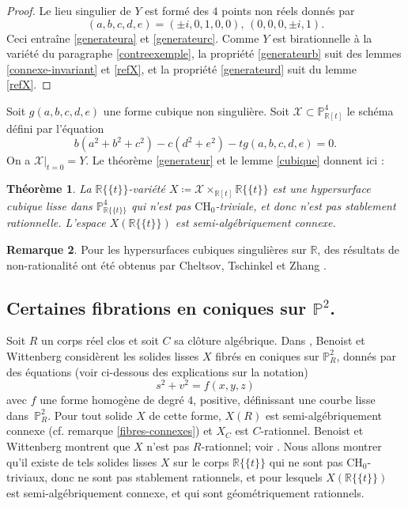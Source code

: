 \documentclass[11pt]{article}
\newcommand{\cf}{cf.\xspace}
\newcommand{\CH}{\mathrm{CH}}
\newtheorem{thm}{Théorème}[section]
\theoremstyle{definition}
\newtheorem{rmk}[thm]{Remarque}
\newcommand{\R}{\mathbb R}
\renewcommand{\P}{\mathbb P}
\newcommand{\mc}[1]{\mathcal{#1}}
\newcommand{\puiseux}{\mathbb{R}\{\!\{t\}\!\}}
\begin{document}
\begin{proof}
Le lieu singulier de $Y$ est formé des $4$ points non réels donnés par
\[
(a,b,c,d,e) = (\pm i, 0,1,0,0),\, (0,0,0, \pm i, 1).
\]
Ceci entraîne \eqref{generateura} et \eqref{generateurc}. Comme $Y$ est birationnelle à la variété du paragraphe \ref{contreexemple}, la propriété \eqref{generateurb} suit des lemmes \ref{connexe-invariant} et \ref{refX}, et la propriété \eqref{generateurd} suit du lemme \ref{refX}.
\end{proof}

Soit $g(a,b,c,d,e)$ une forme cubique non singulière. Soit $\mc{X} \subset \P^4_{\R[t]}$ le schéma défini par l'équation
\[
b(a^2+b^2+c^2) - c(d^2+e^2) -tg(a,b,c,d,e)=0.
\]
On a $\mc{X}|_{t=0}=Y$. Le théorème \ref{generateur} et le lemme \ref{cubique} donnent ici :

\begin{thm}\label{prop-cubique}
La $\puiseux$-variété $X\coloneqq \mc{X}\times_{\R[t]} \puiseux$ est une hypersurface cubique lisse dans $\P^4_{\puiseux}$ qui n'est pas $\CH_0$-triviale, et donc n'est pas
stablement rationnelle. L'espace $X(\puiseux)$ est semi-algébriquement connexe.
\end{thm}

\begin{rmk}
Pour les hypersurfaces cubiques singulières sur $\R$, des résultats de non-rationalité ont été obtenus par Cheltsov, Tschinkel et Zhang \cite{cheltsov2024rationality}.
\end{rmk}

\subsection{Certaines fibrations en coniques sur \texorpdfstring{$\P^2$}{P2}.}

Soit $R$ un corps réel clos et soit $C$ sa clôture algébrique. Dans \cite{benoist2020clemens}, Benoist et Wittenberg considèrent les solides lisses $X$ fibrés en coniques sur
$\P^2_R$, donnés par des équations (voir ci-dessous des explications sur la notation)
\[
s^2+v^2=f(x,y,z)
\]
avec $f$ une forme homogène de degré $4$, positive,
définissant une courbe lisse dans~$\P^2_R$. Pour tout solide $X$ de cette forme, $X(R)$ est semi-algébriquement connexe (\cf remarque \ref{fibres-connexes}) et $X_C$ est $C$-rationnel. Benoist et Wittenberg montrent que $X$ n'est pas $R$-rationnel; voir \cite[Cor.\,3.6]{benoist2020clemens}. Nous allons montrer qu'il existe de tels solides lisses $X$ sur le corps $\puiseux$ qui ne sont pas $\CH_0$-triviaux, donc ne sont pas stablement rationnels, et pour lesquels $X(\puiseux)$ est semi-algébriquement connexe, et qui sont géométriquement rationnels.
\end{document}
